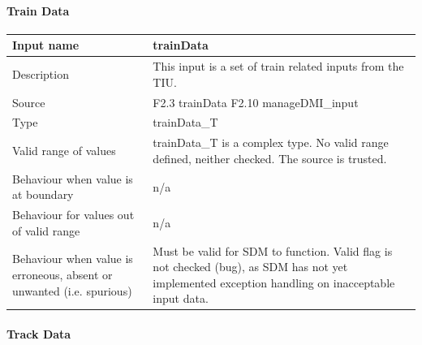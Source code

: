 \paragraph{Train Data}

\begin{longtable}{p{}p{}}
\toprule
Input name				& trainData \\
\midrule
Description				& This input is a set of train related inputs from the TIU. \\
\midrule
Source					&  F2.3 trainData\newline
F2.10 manageDMI\_input \\ 
\midrule
Type					& trainData\_T \\
\midrule
Valid range of values	& trainData\_T is a complex type. No valid range defined, neither checked. The source is trusted. \\
\midrule
Behaviour when value is at boundary	& n/a \\
\midrule
Behaviour for values out of valid range	& n/a \\
\midrule
Behaviour when value is erroneous, absent or unwanted (i.e. spurious) & Must be valid for SDM to function. Valid flag is not checked (bug), as SDM has not yet implemented exception handling on inacceptable input data. \\
\bottomrule
\end{longtable}

\paragraph{Track Data}

